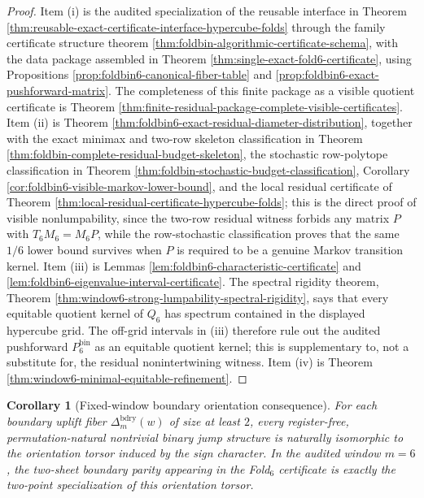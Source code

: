 \documentclass[12pt,a4paper]{article}
\theoremstyle{plain}
\newtheorem{corollary}[theorem]{Corollary}
\theoremstyle{definition}
\numberwithin{equation}{section}
\begin{document}
\begin{proof}
Item \textup{(i)} is the audited specialization of the reusable interface in Theorem \ref{thm:reusable-exact-certificate-interface-hypercube-folds} through the family certificate structure theorem \ref{thm:foldbin-algorithmic-certificate-schema}, with the data package assembled in Theorem \ref{thm:single-exact-fold6-certificate}, using Propositions \ref{prop:foldbin6-canonical-fiber-table} and \ref{prop:foldbin6-exact-pushforward-matrix}.  The completeness of this finite package as a visible quotient certificate is Theorem \ref{thm:finite-residual-package-complete-visible-certificates}.  Item \textup{(ii)} is Theorem \ref{thm:foldbin6-exact-residual-diameter-distribution}, together with the exact minimax and two-row skeleton classification in Theorem \ref{thm:foldbin-complete-residual-budget-skeleton}, the stochastic row-polytope classification in Theorem \ref{thm:foldbin-stochastic-budget-classification}, Corollary \ref{cor:foldbin6-visible-markov-lower-bound}, and the local residual certificate of Theorem \ref{thm:local-residual-certificate-hypercube-folds}; this is the direct proof of visible nonlumpability, since the two-row residual witness forbids any matrix \(P\) with \(T_6M_6=M_6P\), while the row-stochastic classification proves that the same \(1/6\) lower bound survives when \(P\) is required to be a genuine Markov transition kernel.  Item \textup{(iii)} is Lemmas \ref{lem:foldbin6-characteristic-certificate} and \ref{lem:foldbin6-eigenvalue-interval-certificate}.  The spectral rigidity theorem, Theorem \ref{thm:window6-strong-lumpability-spectral-rigidity}, says that every equitable quotient kernel of \(Q_6\) has spectrum contained in the displayed hypercube grid.  The off-grid intervals in \textup{(iii)} therefore rule out the audited pushforward \(P_6^{\mathrm{bin}}\) as an equitable quotient kernel; this is supplementary to, not a substitute for, the residual nonintertwining witness.  Item \textup{(iv)} is Theorem \ref{thm:window6-minimal-equitable-refinement}. \qedhere
\end{proof}

\begin{corollary}[Fixed-window boundary orientation consequence]\label{cor:main-fold6-boundary-orientation-consequence}
For each boundary uplift fiber \(\Delta_m^{\mathrm{bdry}}(w)\) of size at least \(2\), every register-free, permutation-natural nontrivial binary jump structure is naturally isomorphic to the orientation torsor induced by the sign character.  In the audited window \(m=6\), the two-sheet boundary parity appearing in the Fold\(_6\) certificate is exactly the two-point specialization of this orientation torsor.
\end{corollary}
\end{document}
